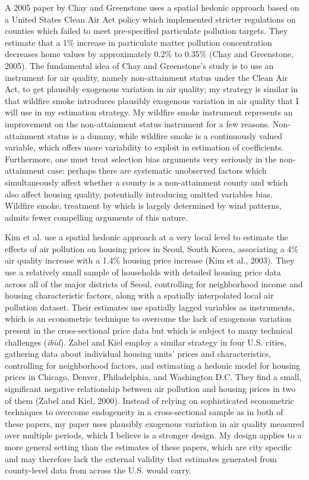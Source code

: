 \documentclass[12pt]{article}
\begin{document}
A 2005 paper by Chay and Greenstone uses a spatial hedonic approach based on a United States Clean Air Act policy which implemented stricter regulations on counties which failed to meet pre-specified particulate pollution targets.  They estimate that a 1\% increase in particulate matter pollution concentration decreases home values by approximately 0.2\% to 0.35\% (Chay and Greenstone, 2005).  The fundamental idea of Chay and Greenstone's study is to use an instrument for air quality, namely non-attainment status under the Clean Air Act, to get plausibly exogenous variation in air quality; my strategy is similar in that wildfire smoke introduces plausibly exogenous variation in air quality that I will use in my estimation strategy.  My wildfire smoke instrument represents an improvement on the non-attainment status instrument for a few reasons.   Non-attainment status is a dummy, while wildfire smoke is a continuously valued variable, which offers more variability to exploit in estimation of coefficients.  Furthermore, one must treat selection bias arguments very seriously in the non-attainment case: perhaps there are systematic unobserved factors which simultaneously affect whether a county is a non-attainment county and which also affect housing quality, potentially introducing omitted variables bias.  Wildfire smoke, treatment by which is largely determined by wind patterns, admits fewer compelling arguments of this nature.

Kim et al. use a spatial hedonic approach at a very local level to estimate the effects of air pollution on housing prices in Seoul, South Korea, associating a 4\% air quality increase with a 1.4\% housing price increase (Kim et al., 2003).  They use a relatively small sample of households with detailed housing price data across all of the major districts of Seoul, controlling for neighborhood income and housing characteristic factors, along with a spatially interpolated local air pollution dataset.  Their estimates use spatially lagged variables as instruments, which is an econometric technique to overcome the lack of exogenous variation present in the cross-sectional price data but which is subject to many technical challenges (\textit{ibid}).  Zabel and Kiel employ a similar strategy in four U.S. cities, gathering data about individual housing units' prices and characteristics, controlling for neighborhood factors, and estimating a hedonic model for housing prices in Chicago, Denver, Philadelphia, and Washington D.C.  They find a small, significant negative relationship between air pollution and housing prices in two of them (Zabel and Kiel, 2000).  Instead of relying on sophisticated econometric techniques to overcome endogeneity in a cross-sectional sample as in both of these papers, my paper uses plausibly exogenous variation in air quality measured over multiple periods, which I believe is a stronger design.  My design applies to a more general setting than the estimates of these papers, which are city specific and may therefore lack the external validity that estimates generated from county-level data from across the U.S. would carry.   
\end{document}
